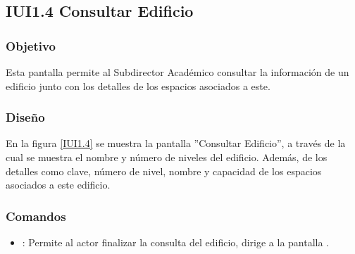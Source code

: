 \subsection{IUI1.4 Consultar Edificio}

\subsubsection{Objetivo}
	Esta pantalla permite al Subdirector Académico consultar la información de un edificio junto con los detalles de los espacios asociados a este.

\subsubsection{Diseño}
	En la figura \ref{IUI1.4} se muestra la pantalla ''Consultar Edificio'', a través de la cual se muestra el nombre y número de niveles del edificio. Además, de los detalles como clave, número de nivel, nombre y capacidad de los espacios asociados a este edificio.


\subsubsection{Comandos}
\begin{itemize}
	\item {}: Permite al actor finalizar la consulta del edificio, dirige a la pantalla .

\end{itemize}

